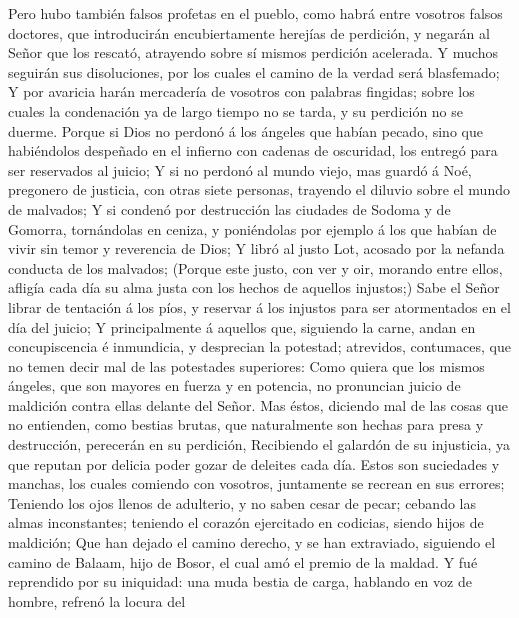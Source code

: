  Pero hubo también falsos profetas en el pueblo, como
habrá entre vosotros falsos doctores, que introducirán encubiertamente
herejías de perdición, y negarán al Señor que los rescató, atrayendo
sobre sí mismos perdición acelerada.  Y muchos seguirán
sus disoluciones, por los cuales el camino de la verdad será blasfemado;
 Y por avaricia harán mercadería de vosotros con palabras
fingidas; sobre los cuales la condenación ya de largo tiempo no se
tarda, y su perdición no se duerme.  Porque si Dios no
perdonó á los ángeles que habían pecado, sino que habiéndolos despeñado
en el infierno con cadenas de oscuridad, los entregó para ser reservados
al juicio;  Y si no perdonó al mundo viejo, mas guardó á
Noé, pregonero de justicia, con otras siete personas, trayendo el
diluvio sobre el mundo de malvados;  Y si condenó por
destrucción las ciudades de Sodoma y de Gomorra, tornándolas en ceniza,
y poniéndolas por ejemplo á los que habían de vivir sin temor y
reverencia de Dios;  Y libró al justo Lot, acosado por la
nefanda conducta de los malvados;  (Porque este justo, con
ver y oir, morando entre ellos, afligía cada día su alma justa con los
hechos de aquellos injustos;)  Sabe el Señor librar de
tentación á los píos, y reservar á los injustos para ser atormentados en
el día del juicio;  Y principalmente á aquellos que,
siguiendo la carne, andan en concupiscencia é inmundicia, y desprecian
la potestad; atrevidos, contumaces, que no temen decir mal de las
potestades superiores:  Como quiera que los mismos
ángeles, que son mayores en fuerza y en potencia, no pronuncian juicio
de maldición contra ellas delante del Señor.  Mas éstos,
diciendo mal de las cosas que no entienden, como bestias brutas, que
naturalmente son hechas para presa y destrucción, perecerán en su
perdición,  Recibiendo el galardón de su injusticia, ya
que reputan por delicia poder gozar de deleites cada día. Estos son
suciedades y manchas, los cuales comiendo con vosotros, juntamente se
recrean en sus errores;  Teniendo los ojos llenos de
adulterio, y no saben cesar de pecar; cebando las almas inconstantes;
teniendo el corazón ejercitado en codicias, siendo hijos de maldición;
 Que han dejado el camino derecho, y se han extraviado,
siguiendo el camino de Balaam, hijo de Bosor, el cual amó el premio de
la maldad.  Y fué reprendido por su iniquidad: una muda
bestia de carga, hablando en voz de hombre, refrenó la locura del
